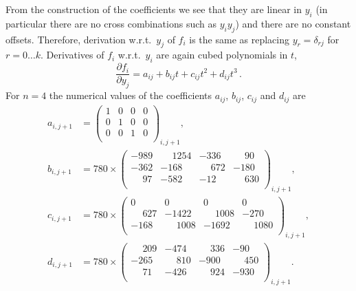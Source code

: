 From the construction of the coefficients we see that they are linear in $y_i$ (in particular there are no cross combinations such as $y_i y_j$) and there are no constant offsets.
Therefore, derivation w.r.t.\ $y_j$ of $f_i$ is the same as replacing $y_r = \delta_{rj}$ for $r = 0 \ldots k$.
Derivatives of $f_i$ w.r.t.\ $y_i$ are again cubed polynomials in $t$,
\begin{equation}
    \label{eq:cspline_derivs}
    \frac{\partial f_i}{\partial y_j} = a_{ij} + b_{ij} t + c_{ij} t^2 + d_{ij} t^3 \,.
\end{equation}
For $n=4$ the numerical values of the coefficients $a_{ij}$, $b_{ij}$, $c_{ij}$ and $d_{ij}$ are
\begin{align*}
    a_{i,j+1} &= \begin{pmatrix}
        1 & 0 & 0 & 0 \\
        0 & 1 & 0 & 0 \\
        0 & 0 & 1 & 0 \\
    \end{pmatrix}_{i,j+1}, \\
    b_{i,j+1} &= 780 \times \begin{pmatrix}
        -989 & \phantom{+} 1254 & -336 & \phantom{+} 90 \\
        -362 & -168 & \phantom{+} 672 & -180 \\
        \phantom{+} 97 & -582 & -12 & \phantom{+} 630 \\
    \end{pmatrix}_{i,j+1}, \\
    c_{i,j+1} &= 780 \times \begin{pmatrix}
        0 & 0 & 0 & 0 \\
        \phantom{+} 627 & -1422 & \phantom{+} 1008 & -270 \\
        -168 & \phantom{+} 1008 & -1692 & \phantom{+} 1080 \\
    \end{pmatrix}_{i,j+1}, \\
    d_{i,j+1} &= 780 \times \begin{pmatrix}
        \phantom{+} 209 & -474 & \phantom{+} 336 & -90 \\
        -265 & \phantom{+} 810 & -900 & \phantom{+} 450 \\
        \phantom{+} 71 & -426 & \phantom{+} 924 & -930 \\
    \end{pmatrix}_{i,j+1} . \\
\end{align*}
